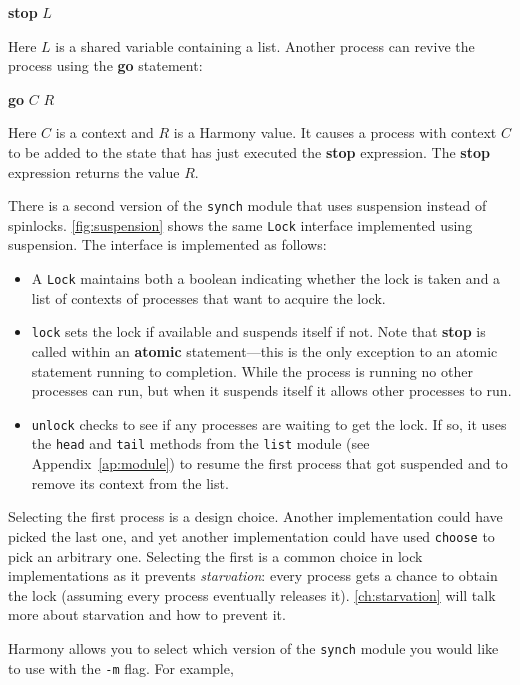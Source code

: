 \documentclass{report}
\newenvironment{code}{
\tcolorbox
}{
\endtcolorbox
}
\begin{document}
\begin{code}
\textbf{stop} $L$
\end{code}

Here $L$ is a shared variable containing a list.
Another process can revive the process using the \textbf{go}
%
statement:

\begin{code}
\textbf{go} $C$ $R$
\end{code}

Here $C$ is a context and $R$ is a Harmony value.
It causes a process with context $C$ to be added to the state that has
just executed the \textbf{stop}
%
expression.  The \textbf{stop} expression returns the value $R$.

There is a second version of the \texttt{synch} module that uses suspension
instead of spinlocks.
\autoref{fig:suspension} shows the same \texttt{Lock} interface implemented
using suspension.
The interface is implemented as follows:
\begin{itemize}
\item A \texttt{Lock} maintains both a boolean indicating whether the
lock is taken and a list of contexts of processes that want to acquire the lock.
\item
\texttt{lock}
%
sets the lock if available and suspends itself if not.
Note that \textbf{stop} is called within an \textbf{atomic} statement---this is
the only exception to an atomic statement running to completion.  While the
process is running no other processes can run, but when it suspends itself
it allows other processes to run.
\item
\texttt{unlock}
%
checks to see if any processes are waiting to get the lock.
If so, it uses the \texttt{head} and \texttt{tail}
methods from the \texttt{list} module (see Appendix~\ref{ap:module})
to resume the first process that got
suspended and to remove its context from the list.
\end{itemize}
Selecting the first process is a design choice.  Another implementation could
have picked the last one, and yet another implementation could have used
\texttt{choose} to pick an arbitrary one.  Selecting the first is a common
choice in lock implementations as it prevents \emph{starvation}:
%
every process
gets a chance to obtain the lock (assuming every process eventually releases
it).  \autoref{ch:starvation} will talk more about starvation and how
to prevent it.

Harmony allows you to select which version of the \texttt{synch} module you would
like to use with the \texttt{-m} flag.
%
For example,
\end{document}
